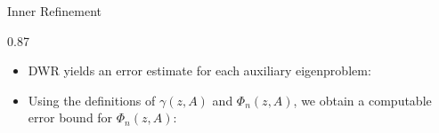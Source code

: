 \documentclass[aspectratio=169]{beamer}
\begin{document}
\begin{frame}{Inner Refinement}
\begin{overlayarea}{\textwidth}{0.87\textheight}

\begin{itemize}
    \item<1-> DWR yields an error estimate for each auxiliary eigenproblem:
\end{itemize}


\vspace{0.25cm}

\begin{itemize}
    \item<2-> Using the definitions of $\gamma(z,A)$ and $\Phi_n(z,A)$, we obtain a computable error bound for $\Phi_n(z,A)$:
\end{itemize}


\end{overlayarea}
\end{frame}
\end{document}
